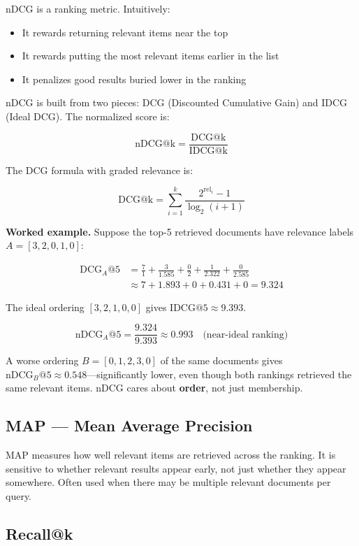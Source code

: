 nDCG is a ranking metric. Intuitively:

\begin{itemize}
    \item It rewards returning relevant items near the top
    \item It rewards putting the most relevant items earlier in the list
    \item It penalizes good results buried lower in the ranking
\end{itemize}

nDCG is built from two pieces: DCG (Discounted Cumulative Gain) and IDCG (Ideal DCG).
The normalized score is:

\[
\text{nDCG@k} = \frac{\text{DCG@k}}{\text{IDCG@k}}
\]

The DCG formula with graded relevance is:

\[
\text{DCG@k} = \sum_{i=1}^{k} \frac{2^{\text{rel}_i} - 1}{\log_2(i + 1)}
\]

\textbf{Worked example.} Suppose the top-5 retrieved documents have relevance labels
$A = [3, 2, 0, 1, 0]$:

\begin{align*}
\text{DCG}_A@5 &= \frac{7}{1} + \frac{3}{1.585} + \frac{0}{2} + \frac{1}{2.322} + \frac{0}{2.585} \\
               &\approx 7 + 1.893 + 0 + 0.431 + 0 = 9.324
\end{align*}

The ideal ordering $[3, 2, 1, 0, 0]$ gives $\text{IDCG@5} \approx 9.393$.

\[
\text{nDCG}_A@5 = \frac{9.324}{9.393} \approx 0.993 \quad \text{(near-ideal ranking)}
\]

A worse ordering $B = [0, 1, 2, 3, 0]$ of the same documents gives
$\text{nDCG}_B@5 \approx 0.548$---significantly lower, even though both rankings retrieved
the same relevant items. nDCG cares about \textbf{order}, not just membership.

\subsection{MAP --- Mean Average Precision}

MAP measures how well relevant items are retrieved across the ranking. It is sensitive to
whether relevant results appear early, not just whether they appear somewhere. Often used
when there may be multiple relevant documents per query.

\subsection{Recall@k}

